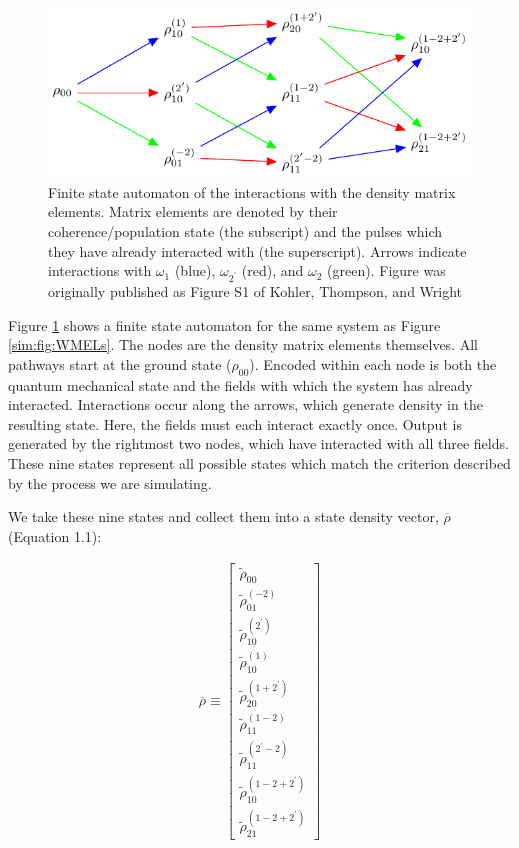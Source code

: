 \begin{figure}
\centering
	\includegraphics[width=\textwidth]{simulation/images/flow_diagram.pdf}
\caption{Finite state automaton of the interactions with the density
matrix elements. Matrix elements are denoted by their
coherence/population state (the subscript) and the pulses which they
have already interacted with (the superscript). Arrows indicate
interactions with \(\omega_1\) (blue), \(\omega_{2^\prime}\) (red), and
\(\omega_2\) (green). Figure was originally published as Figure S1 of
Kohler, Thompson, and Wright \cite{KohlerDanielDavid2017a} \label{sim:fig:fsa}}
\end{figure}

Figure \ref{sim:fig:fsa} shows a finite state automaton for the same
system as Figure \ref{sim:fig:WMELs}. The nodes are the density matrix
elements themselves. All pathways start at the ground state
(\(\rho_{00}\)). Encoded within each node is both the quantum mechanical
state and the fields with which the system has already interacted.
Interactions occur along the arrows, which generate density in the
resulting state. Here, the fields must each interact exactly once.
Output is generated by the rightmost two nodes, which have interacted
with all three fields. These nine states represent all possible states
which match the criterion described by the process we are simulating.

We take these nine states and collect them into a state density vector,
\(\overline{\rho}\) (Equation 1.1):

\[\begin{aligned}
\overline{\rho} \equiv
\begin{bmatrix}
\tilde{\rho}_{00} \\
\tilde{\rho}_{01}^{(-2)} \\
\tilde{\rho}_{10}^{(2^\prime)} \\
\tilde{\rho}_{10}^{(1)} \\
\tilde{\rho}_{20}^{(1+2^\prime)} \\
\tilde{\rho}_{11}^{(1-2)} \\
\tilde{\rho}_{11}^{(2^\prime-2)} \\
\tilde{\rho}_{10}^{(1-2+2^\prime)} \\
\tilde{\rho}_{21}^{(1-2+2^\prime)}
\end{bmatrix}
\end{aligned}\]

